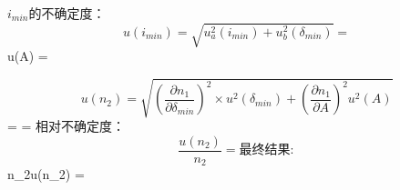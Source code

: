 ${i}_{min}$的不确定度：
$$u({i}_{min}) = \sqrt{u^2_a({i}_{min})+u^2_b({\delta}_{min})} = %

$$u(A) = %

$$u(n_2) = \sqrt{(\displaystyle\frac{{\partial}n_1}{{\partial}{\delta}_{min}})^2{\times}u^2({\delta}_{min})+(\displaystyle\frac{{\partial}n_1}{{\partial}A})^2u^2(A)} %
$$= \displaystyle{}\displaystyle{}\displaystyle{} = %
相对不确定度：
$$\displaystyle\frac{u(n_2)}{n_2} = %

最终结果:
$${n_2}{\pm}u({n_2}) = %